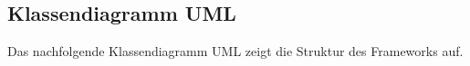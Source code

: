 \subsection{Klassendiagramm UML}
Das nachfolgende Klassendiagramm UML zeigt die Struktur des Frameworks auf.

\vspace{2mm}

\vspace{2mm}
